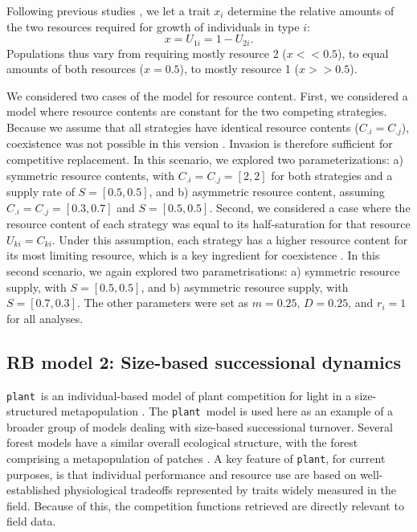 \documentclass[a4paper,11pt]{article}
\newcommand{\plant}{{\tt plant}}
\begin{document}
Following previous studies \citep{Tilman-1985, Schreiber-2003, Fox-2008}, we let a trait $x_i$ determine the relative amounts of the two resources required for growth of individuals in type $i$: \begin{equation}
\label{eq:R3}
x = U_{1i} = 1 - U_{2i}.
\end{equation}
Populations thus vary from requiring mostly resource 2 ($x << 0.5$), to equal amounts of both resources ($x = 0.5$), to mostly resource 1 ($x >> 0.5$).

We considered two cases of the model for resource content. First, we considered a model where resource contents are constant for the two competing strategies. Because we assume that all strategies have identical resource contents ($C_{.i} = C_{.j}$), coexistence was not possible in this version \citep{Tilman-1982}. Invasion is therefore sufficient for competitive replacement. In this scenario, we explored two parameterizations: a) symmetric resource contents, with $C_{.i} = C_{.j} = [2,2]$ for both strategies and a supply rate of $S = [0.5, 0.5]$, and b) asymmetric resource content, assuming $C_{.i} = C_{.j} = [0.3,0.7]$ and $S = [0.5, 0.5]$. Second, we considered a case where the resource content of each strategy was equal to its half-saturation for that resource $U_{ki} = C_{ki}$. Under this assumption, each strategy has a higher resource content for its most limiting resource, which is a key ingredient for coexistence \citep{Tilman-1982}. In this second scenario, we again explored two parametrisations: a) symmetric resource supply, with $S = [0.5, 0.5]$, and b) asymmetric resource supply, with $S = [0.7, 0.3]$. The other parameters were set as $m = 0.25$, $D=0.25$, and $r_i = 1$ for all analyses. 

\subsection{RB model 2: Size-based successional dynamics}

\plant\ is an individual-based model of plant competition for light in a size-structured metapopulation \citep{Falster-2016, Falster-2018}. The \plant\ model is used here as an example of a broader group of models dealing with size-based successional turnover. Several forest models have a similar overall ecological structure, with the forest comprising a metapopulation of patches \citep{Huston-1987,Kohyama-1993,Moorcroft-2001, Medvigy-2012, Smith-2014}. A key feature of \plant, for current purposes, is that individual performance and resource use are based on well-established physiological tradeoffs represented by traits widely measured in the field. Because of this, the competition functions retrieved are directly relevant to field data.
\end{document}
